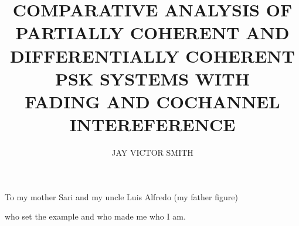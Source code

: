 \documentclass[12pt]{report}
\begin{document}
    
       \author{JAY VICTOR SMITH}
       \title{COMPARATIVE ANALYSIS OF PARTIALLY COHERENT AND  DIFFERENTIALLY COHERENT PSK
        SYSTEMS WITH \\ FADING AND COCHANNEL INTEREFERENCE}



          \titlepage


         \copyrightpage

\newpage
\thispagestyle{empty}

	\vspace*{1.0in}
	\begin{center}
		To my mother Sari and my uncle Luis Alfredo (my father figure)

		who set the example and who made me who I am.
	\end{center}

\newpage

\end{document}
